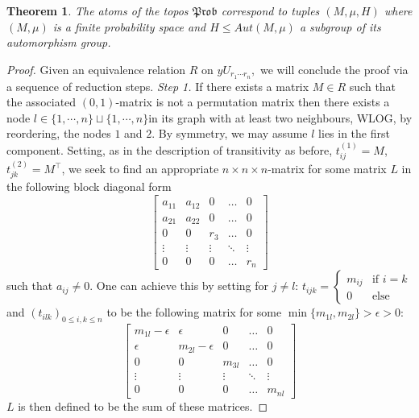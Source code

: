 \documentclass[a4paper]{amsproc}
\theoremstyle{plain}
\newtheorem{theorem}{Theorem}[section]
\theoremstyle{definition}
\theoremstyle{remark}
\numberwithin{equation}{section}
\newcommand{\Prob}{\mathfrak{Prob}}
\begin{document}
\begin{theorem}
The atoms of the topos $\Prob$ correspond to tuples $(M, \mu, H)$ where $(M,\mu)$ is a finite probability space and $H\leq Aut(M,\mu)$ a subgroup of its automorphism group.
\end{theorem}
\begin{proof}
Given an equivalence relation $R$ on $yU_{r_1\cdots r_n},$ we will conclude the proof via a sequence of reduction steps.\newline
\newline
\emph{Step 1.} If there exists a matrix $M\in R$ such that the associated $(0,1)$-matrix is not a permutation matrix then there exists a node $l\in \{1,\cdots,n\} \sqcup\{1,\cdots,n\}$in its graph with at least two neighbours, WLOG, by reordering, the nodes $1$ and $2$. By symmetry, we may assume $l$ lies in the first component. Setting, as in the description of transitivity as before, $t^{(1)}_{ij}=M$, $t^{(2)}_{jk}=M^\top$, we seek to find an appropriate $n\times n \times n$-matrix for some matrix $L$ in the following block diagonal form
\[ \begin{bmatrix}
    a_{11}      & a_{12} & 0&\dots & 0 \\
    a_{21}     & a_{22} &  0&\dots &0 \\
    0 & 0& r_3 &\dots & 0\\
    \vdots & \vdots & \vdots &  \ddots& \vdots\\
    0       & 0& 0 & \dots & r_n
\end{bmatrix} \]
such that $a_{ij}\neq 0$. One can achieve this by setting for $j\neq l$: $t_{ijk}=\begin{cases}  m_{ij} &\text{if }i=k \\ 0 & \text{else}  \end{cases}$ and $(t_{ilk})_{0\leq i,k\leq n}$ to be the following matrix for some $\min\{m_{1l},m_{2l}\}>\epsilon> 0$:
\[ \begin{bmatrix}
    m_{1l}-\epsilon  & \epsilon & 0&\dots & 0 \\
  \epsilon     &m_{2l}-\epsilon &  0&\dots &0 \\
    0 & 0& m_{3l} &\dots & 0\\
    \vdots & \vdots & \vdots &  \ddots& \vdots\\
    0       & 0& 0 & \dots & m_{nl}
\end{bmatrix} \]
$L$ is then defined to be the sum of these matrices.
\newline
\newline

\end{proof}
\end{document}
